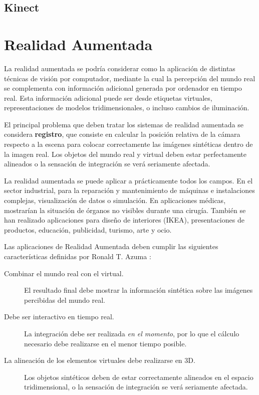 \subsection{Kinect}

\section{Realidad Aumentada}


La realidad aumentada se podría considerar como la aplicación de distintas técnicas de visión por computador, mediante la cual la percepción del mundo real se complementa con información adicional generada por ordenador en tiempo real. Esta información adicional puede ser desde etiquetas virtuales, representaciones de modelos tridimensionales, o incluso cambios de iluminación. 

El principal problema que deben tratar los sistemas de realidad aumentada se considera \textbf{registro}, que consiste en calcular la posición relativa de la cámara respecto a la escena para colocar correctamente las imágenes sintéticas dentro de la imagen real. Los objetos del mundo real y virtual deben estar perfectamente alineados o la sensación de integración se verá seriamente afectada.

La realidad aumentada se puede aplicar a prácticamente todos los campos. En el sector industrial, para la reparación y mantenimiento de máquinas e instalaciones complejas, visualización de datos o simulación.  En aplicaciones médicas, mostrarían la situación de órganos no visibles durante una cirugía. También se han realizado aplicaciones para diseño de interiores (IKEA), presentaciones de productos, educación, publicidad, turismo, arte y ocio. 

Las aplicaciones de Realidad Aumentada deben cumplir las siguientes características definidas por Ronald T. Azuma \cite{Azuma}:

\begin{description}
\item[Combinar el mundo real con el virtual.] El resultado final debe mostrar la información sintética sobre las imágenes percibidas del mundo real.
\item[Debe ser interactivo en tiempo real.] La integración debe ser realizada \emph{en el momento}, por lo que el cálculo necesario debe realizarse en el menor tiempo posible.
\item[La alineación de los elementos virtuales debe realizarse en 3D.] Los objetos sintéticos deben de estar correctamente alineados en el espacio tridimensional,  o la sensación de integración se verá seriamente afectada.
\end{description}

